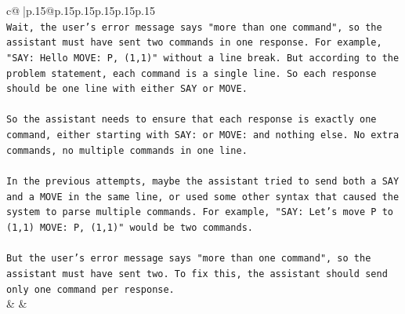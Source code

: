 \documentclass{article}
\begin{document}
{\begin{supertabular}{c@{$\;$}|p{.15\linewidth}@{}p{.15\linewidth}p{.15\linewidth}p{.15\linewidth}p{.15\linewidth}p{.15\linewidth}}
{{{\\ 
\texttt{Wait, the user's error message says "more than one command", so the assistant must have sent two commands in one response. For example, "SAY: Hello MOVE: P, (1,1)" without a line break. But according to the problem statement, each command is a single line. So each response should be one line with either SAY or MOVE.} \\
\\ 
\texttt{So the assistant needs to ensure that each response is exactly one command, either starting with SAY: or MOVE: and nothing else. No extra commands, no multiple commands in one line.} \\
\\ 
\texttt{In the previous attempts, maybe the assistant tried to send both a SAY and a MOVE in the same line, or used some other syntax that caused the system to parse multiple commands. For example, "SAY: Let's move P to (1,1) MOVE: P, (1,1)" would be two commands.} \\
\\ 
\texttt{But the user's error message says "more than one command", so the assistant must have sent two. To fix this, the assistant should send only one command per response.} \\
            }
        }
    }
    & & \\ \\


\end{supertabular}}
\end{document}
